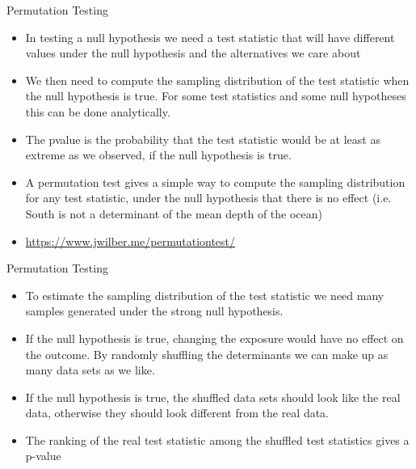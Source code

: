 \documentclass[10pt,handout]{beamer}\usepackage[]{graphicx}\usepackage[]{color}
\begin{document}
\begin{frame}{Permutation Testing}
	\begin{itemize}
		\item In testing a null hypothesis we need a test statistic that will have different values under the null hypothesis and the alternatives we	care about 
		\item We then need to compute the sampling distribution of the test	statistic when the null hypothesis is true. For some test statistics	and some null hypotheses this can be done analytically. 
		\item The pvalue is the probability that the test statistic would be at	least as extreme as we observed, if the null hypothesis is true.
		\item A permutation test gives a simple way to compute the sampling	distribution for any test statistic, under the null hypothesis that there is no effect (i.e. South is not a determinant of the mean depth of the ocean)
		\item \url{https://www.jwilber.me/permutationtest/}
	\end{itemize}
\end{frame}


\begin{frame}{Permutation Testing}
	\begin{itemize}
		\item To estimate the sampling distribution of the test statistic we
		need many samples generated under the strong null hypothesis.
		\item If the null hypothesis is true, changing the exposure would have
		no effect on the outcome. By randomly shuffling the determinants
		we can make up as many data sets as we like.
		\item If the null hypothesis is true, the shuffled data sets should look
		like the real data, otherwise they should look different from the real data.
		\item The ranking of the real test statistic among the shuffled test
		statistics gives a p-value
	\end{itemize}
\end{frame}
\end{document}
